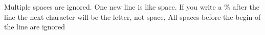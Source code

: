 \documentclass{article}
\begin{document}
\vspace*{\fill} \vspace*{-5ex}

Multiple spaces      are ignored.
 One new line is like space.
If you write a \% after the line%
    the next character will be the letter, not space, 
    All spaces before the begin of the line are ignored

\vspace*{\fill}
\end{document}
